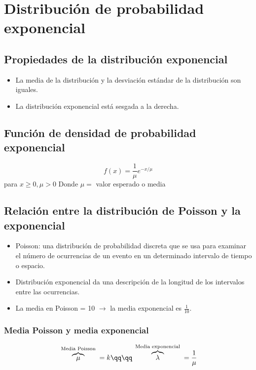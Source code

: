 \documentclass{article}
\begin{document}
\hrulefill
\section{Distribución de probabilidad exponencial}
\subsection{Propiedades de la distribución exponencial}
\begin{itemize}
    \item La media de la distribución y la desviación estándar de la distribución son iguales. 
    \item La distribución exponencial está sesgada a la derecha.
\end{itemize}

\subsection{Función de densidad de probabilidad exponencial}
\[
  f(x) = \frac{1}{\mu} e^{-x/\mu }
\] para $x\geq 0, \mu > 0$ \newline 
Donde $\mu=$ valor esperado o media 


\subsection{Relación entre la distribución de Poisson y la exponencial}
\begin{itemize}
    \item Poisson: una distribución de probabilidad discreta que se usa para examinar el número de ocurrencias de un evento en un determinado intervalo de tiempo o espacio. 
    \item Distribución exponencial da una descripción de la longitud de los intervalos entre las ocurrencias. 
\end{itemize}
\begin{itemize}
    \item La media en Poisson = 10 $\rightarrow$ la media exponencial es $\frac{1}{10} $. 
\end{itemize}
\subsubsection{Media Poisson y media exponencial}
\[
    \overbrace{\mu}^{\text{ Media Poisson }} = k \qq \qq \overbrace{\lambda}^{\text{ Media exponencial }} = \frac{1}{\mu} 
\]


\end{document}
